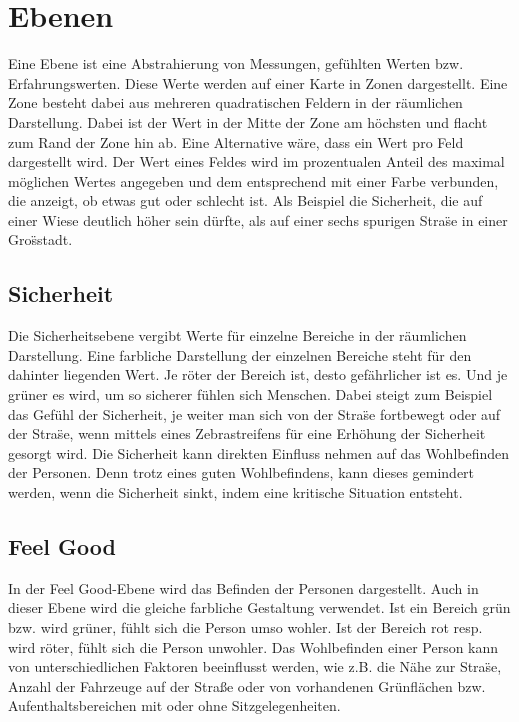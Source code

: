 \documentclass[10pt]{scrartcl}
\begin{document}
\section{Ebenen}\label{sec:Ebenen}
Eine Ebene ist eine Abstrahierung von Messungen, gef\"uhlten Werten bzw. Erfahrungswerten. Diese Werte werden auf einer Karte in Zonen dargestellt. Eine Zone besteht dabei aus mehreren quadratischen Feldern in der r\"aumlichen Darstellung. Dabei ist der Wert in der Mitte der Zone am h\"ochsten und flacht zum Rand der Zone hin ab. Eine Alternative w\"are, dass ein Wert pro Feld dargestellt wird.
\newline Der Wert eines Feldes wird im prozentualen Anteil des maximal m\"oglichen Wertes angegeben und dem entsprechend mit einer Farbe verbunden, die anzeigt, ob etwas gut oder schlecht ist. Als Beispiel die Sicherheit, die auf einer Wiese deutlich h\"oher sein d\"urfte, als auf einer sechs spurigen Stra\"se in einer Gro\"sstadt.

\subsection{Sicherheit}
Die Sicherheitsebene vergibt Werte f\"ur einzelne Bereiche in der r\"aumlichen Darstellung. Eine farbliche Darstellung der einzelnen Bereiche steht f\"ur den dahinter liegenden Wert. Je r\"oter der Bereich ist, desto gef\"ahrlicher ist es. Und je gr\"uner es wird, um so sicherer f\"uhlen sich Menschen. Dabei steigt zum Beispiel das Gef\"uhl der Sicherheit, je weiter man sich von der Stra\"se fortbewegt oder auf der Stra\"se, wenn mittels eines Zebrastreifens f\"ur eine Erh\"ohung der Sicherheit gesorgt wird.
\newline Die Sicherheit kann direkten Einfluss nehmen auf das Wohlbefinden der Personen. Denn trotz eines guten Wohlbefindens, kann dieses gemindert werden, wenn die Sicherheit sinkt, indem eine kritische Situation entsteht.

\subsection{Feel Good}
In der Feel Good-Ebene wird das Befinden der Personen dargestellt. Auch in dieser Ebene wird die gleiche farbliche Gestaltung verwendet. Ist ein Bereich gr\"un bzw. wird gr\"uner, f\"uhlt sich die Person umso wohler. Ist der Bereich rot resp. wird r\"oter, f\"uhlt sich die Person unwohler. Das Wohlbefinden einer Person kann von unterschiedlichen Faktoren beeinflusst werden, wie z.B. die N\"ahe zur Stra\"se, Anzahl der Fahrzeuge auf der Straße oder von vorhandenen Gr\"unfl\"achen bzw. Aufenthaltsbereichen mit oder ohne Sitzgelegenheiten.
\end{document}
